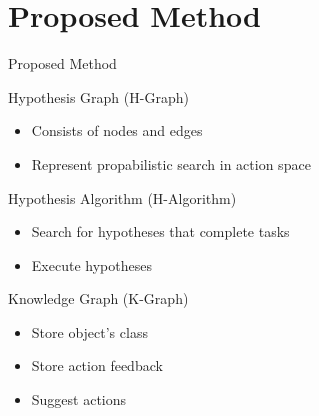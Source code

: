 \section{Proposed Method}










\begin{frame}[fragile]{Proposed Method} 
\begin{block}{Hypothesis Graph (H-Graph)}
    \begin{itemize}
      \item Consists of nodes and edges
      \item Represent propabilistic search in action space
    \end{itemize}
  \end{block}\pause

\begin{block}{Hypothesis Algorithm (H-Algorithm)}
    \begin{itemize}
      \item Search for hypotheses that complete tasks
      \item Execute hypotheses
    \end{itemize}
  \end{block}\pause

\begin{block}{Knowledge Graph (K-Graph)}
    \begin{itemize}
      \item Store object's class
      \item Store action feedback
      \item Suggest actions
    \end{itemize}
  \end{block}
\end{frame}


